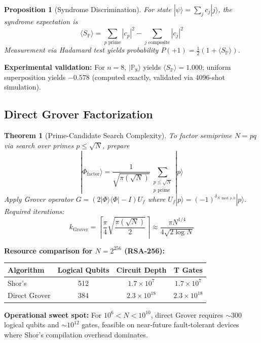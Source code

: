 \documentclass[11pt,letterpaper]{article}
\newtheorem{theorem}{Theorem}
\newtheorem{proposition}{Proposition}
\begin{document}
\begin{proposition}[Syndrome Discrimination]
For state $|\psi\rangle = \sum_j c_j |j\rangle$, the syndrome expectation is
\[
\langle S_{\mathbb{P}} \rangle = \sum_{p \text{ prime}} |c_p|^2 - \sum_{j \text{ composite}} |c_j|^2
\]
Measurement via Hadamard test yields probability $P(+1) = \frac{1}{2}(1 + \langle S_{\mathbb{P}} \rangle)$.
\end{proposition}

\textbf{Experimental validation:} For $n=8$, $|\mathbb{P}_8\rangle$ yields $\langle S_{\mathbb{P}} \rangle = 1.000$; uniform superposition yields $-0.578$ (computed exactly, validated via 4096-shot simulation).

\subsection{Direct Grover Factorization}

\begin{theorem}[Prime-Candidate Search Complexity]
To factor semiprime $N = pq$ via search over primes $p \leq \sqrt{N}$, prepare
\[
|\Phi_{\text{factor}}\rangle = \frac{1}{\sqrt{\pi(\sqrt{N})}} \sum_{\substack{p \leq \sqrt{N} \\ p \text{ prime}}} |p\rangle
\]
Apply Grover operator $G = (2|\Phi\rangle\langle\Phi| - I)U_f$ where $U_f|p\rangle = (-1)^{\delta_{N \bmod p, 0}}|p\rangle$. Required iterations:
\[
k_{\text{Grover}} = \left\lceil \frac{\pi}{4}\sqrt{\frac{\pi(\sqrt{N})}{2}} \right\rceil \approx \frac{\pi N^{1/4}}{4\sqrt{2\log N}}
\]
\end{theorem}

\textbf{Resource comparison for $N=2^{256}$ (RSA-256):}
\begin{center}
\begin{tabular}{lccc}
\hline
Algorithm & Logical Qubits & Circuit Depth & T Gates \\
\hline
Shor's & 512 & $1.7 \times 10^7$ & $1.7 \times 10^7$ \\
Direct Grover & 384 & $2.3 \times 10^{18}$ & $2.3 \times 10^{18}$ \\
\hline
\end{tabular}
\end{center}

\textbf{Operational sweet spot:} For $10^6 < N < 10^{10}$, direct Grover requires $\sim 300$ logical qubits and $\sim 10^{12}$ gates, feasible on near-future fault-tolerant devices where Shor's compilation overhead dominates.
\end{document}
